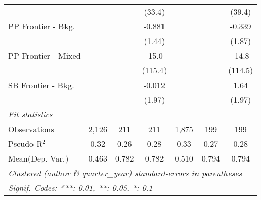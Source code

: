 \begin{tabular}{lcccccc}
                        &         &        & (33.4)       &         &        & (39.4)\\   
   PP Frontier - Bkg.   &         &        & -0.881       &         &        & -0.339\\   
                        &         &        & (1.44)       &         &        & (1.87)\\   
   PP Frontier - Mixed  &         &        & -15.0        &         &        & -14.8\\   
                        &         &        & (115.4)      &         &        & (114.5)\\   
   SB Frontier - Bkg.   &         &        & -0.012       &         &        & 1.64\\   
                        &         &        & (1.97)       &         &        & (1.97)\\   
   \midrule
   \emph{Fit statistics}\\
   Observations         & 2,126   & 211    & 211          & 1,875   & 199    & 199\\  
   Pseudo R$^2$         & 0.32    & 0.26   & 0.28         & 0.33    & 0.27   & 0.28\\  
Mean(Dep. Var.) & 0.463 & 0.782 & 0.782 & 0.510 & 0.794 & 0.794 \\
   \midrule \midrule
   \multicolumn{7}{l}{\emph{Clustered (author \& quarter\_year) standard-errors in parentheses}}\\
   \multicolumn{7}{l}{\emph{Signif. Codes: ***: 0.01, **: 0.05, *: 0.1}}\\
\end{tabular}
\par\endgroup
